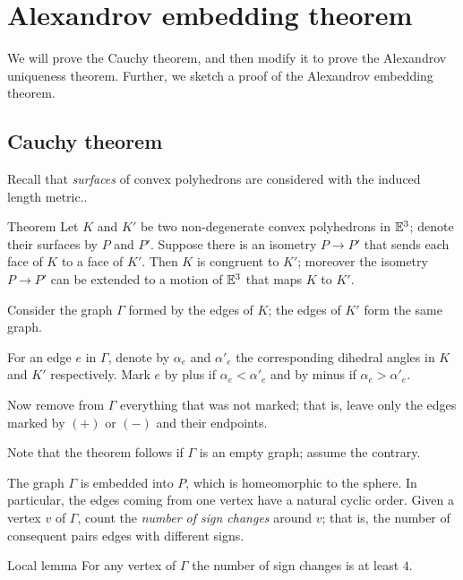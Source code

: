 \chapter{Alexandrov embedding theorem}

We will prove the Cauchy theorem, and then modify it to prove the Alexandrov uniqueness theorem.
Further, we sketch a proof of the Alexandrov embedding theorem.


\section{Cauchy theorem}

Recall that \textit{surfaces} of convex polyhedrons are considered with the induced length metric..
 
\begin{thm}{Theorem}\label{thm:cauchy} Let $K$ and $K'$ be two non-degenerate convex polyhedrons in $\mathbb{E}^3$;
denote their surfaces 
by $P$ and $P'$.
Suppose there is an isometry $P\to P'$ that sends each face of $K$ to a face of $K'$.
Then $K$ is congruent to $K'$; moreover the isometry $P\to P'$ can be extended to a motion of $\mathbb{E}^3$ that maps $K$  to $K'$.
\end{thm}

Consider the graph $\Gamma$ formed by the edges of $K$;
the edges of $K'$ form the same graph.
 
For an edge $e$ in $\Gamma$, denote by $\alpha_e$ and $\alpha'_e$ the corresponding dihedral angles in $K$ and $K'$ respectively.
Mark $e$ by plus if $\alpha_e < \alpha'_e$ and by minus if $\alpha_e > \alpha'_e$.

Now remove from $\Gamma$ everything that was not marked;
that is, leave only the edges marked by $(+)$ or $(-)$ and their endpoints.

Note that the theorem follows if $\Gamma$ is an empty graph;
assume the contrary.

The graph $\Gamma$ is embedded into $P$, which is homeomorphic to the sphere.
In particular, the edges coming from one vertex have a natural cyclic order. 
Given a vertex $v$ of $\Gamma$, count the \textit{number of sign changes} around $v$;
that is, the number of consequent pairs edges with different signs. 

\begin{thm}{Local lemma}\label{lem:local}
For any vertex of $\Gamma$ the number of sign changes is at least $4$.
\end{thm}

